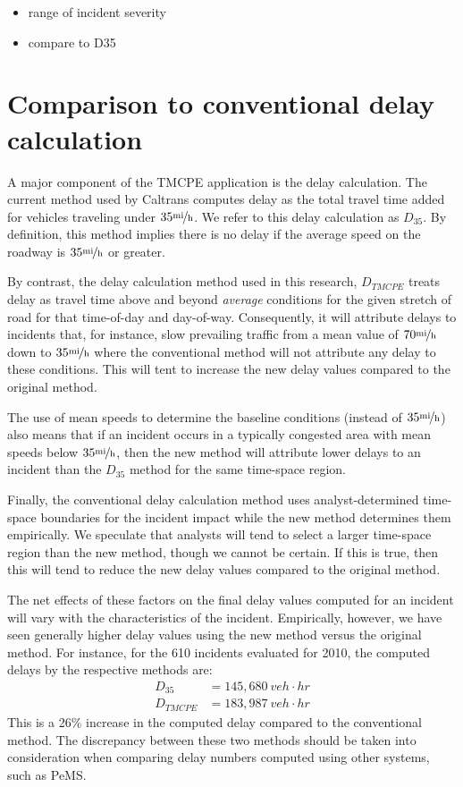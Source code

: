 \documentclass[12pt]{report}
\renewcommand{\fixme}[3][]{#1\xspace}
\newcounter{time}
\newcounter{space}
\begin{document}
\begin{itemize}
\item range of incident severity
\item compare to D35
\end{itemize}

\section{Comparison to conventional delay calculation}
\label{sec:compare-conv}

A major component of the \ac{TMCPE} application is the delay calculation.  The
current method used by Caltrans computes delay as the total travel time added
for vehicles traveling under \fixme[$35\unitfrac{mi}{h}$]{crindt}{refer to the
  original equation}.  We refer to this delay calculation as $D_{35}$.  By
definition, this method implies there is no delay if the average speed on the
roadway is $35\unitfrac{mi}{h}$ or greater.

By contrast, the delay calculation method used in this research, $D_{TMCPE}$
treats delay as travel time above and beyond \emph{average} conditions for the
given stretch of road for that time-of-day and day-of-way.  Consequently, it
will attribute delays to incidents that, for instance, slow prevailing traffic
from a mean value of $70\unitfrac{mi}{h}$ down to $35\unitfrac{mi}{h}$ where the
conventional method will not attribute any delay to these conditions.  This will
tent to increase the new delay values compared to the original method.

The use of mean speeds to determine the baseline conditions (instead of
$35\unitfrac{mi}{h}$) also means that if an incident occurs in a typically
congested area with mean speeds below $35\unitfrac{mi}{h}$, then the new method
will attribute lower delays to an incident than the $D_{35}$ method for the same
time-space region.

Finally, the conventional delay calculation method uses analyst-determined
time-space boundaries for the incident impact while the new method determines
them empirically.  We speculate that analysts will tend to select a larger
time-space region than the new method, though we cannot be certain.  If this is
true, then this will tend to reduce the new delay values compared to the
original method.

The net effects of these factors on the final delay values computed for an
incident will vary with the characteristics of the incident.  Empirically,
however, we have seen generally higher delay values using the new method versus
the original method.  For instance, for the 610 incidents evaluated for 2010,
the computed delays by the respective methods are:
\begin{eqnarray*}
    D_{35}   & = 145,680\:\unit{veh\cdot{}hr} \\
    D_{TMCPE} & = 183,987\:\unit{veh\cdot{}hr}
\end{eqnarray*}
This is a 26\% increase in the computed delay compared to the conventional
method.  The discrepancy between these two methods should be taken into
consideration when comparing delay numbers computed using other systems, such as
\ac{PeMS}.
\end{document}
